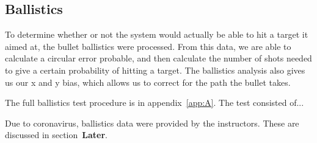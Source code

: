 ﻿\subsection{Ballistics}
To determine whether or not the system would actually be able to hit a target it aimed at, the bullet ballistics were processed. From this data, we are able to calculate a circular error probable, and then calculate the number of shots needed to give a certain probability of hitting a target. The ballistics analysis also gives us our x and y bias, which allows us to correct for the path the bullet takes.

The full ballistics test procedure is in appendix~\ref{app:A}. The test consisted of...

Due to coronavirus, ballistics data were provided by the instructors. These are discussed in section~\textbf{Later}.

